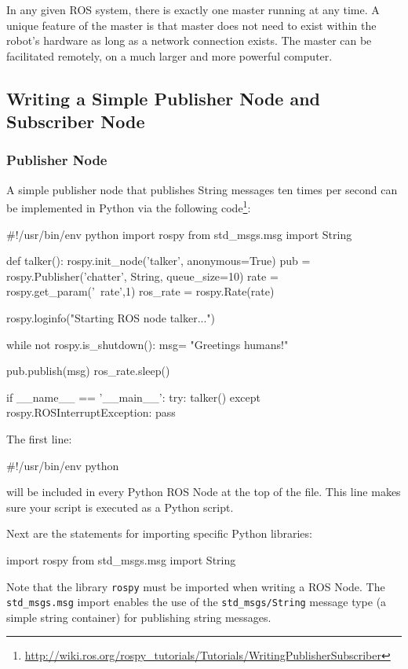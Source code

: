 In any given ROS system, there is exactly one master running at any time. A unique feature of the master is that master does not need to exist within the robot's hardware as long as a network connection exists. The master can be facilitated remotely, on a much larger and more powerful computer.

\subsection{Writing a Simple Publisher Node and Subscriber Node}
\subsubsection{Publisher Node}
A simple publisher node that publishes String messages ten times per second can be implemented in Python via the following code\footnote{\url{http://wiki.ros.org/rospy_tutorials/Tutorials/WritingPublisherSubscriber}}:
\begin{python}
#!/usr/bin/env python
import rospy
from std_msgs.msg import String

def talker():
    rospy.init_node('talker', anonymous=True)
    pub = rospy.Publisher('chatter', String, queue_size=10)
    rate = rospy.get_param('~rate',1)
    ros_rate = rospy.Rate(rate)
    
    rospy.loginfo("Starting ROS node talker...")
    
    while not rospy.is_shutdown():
        msg= "Greetings humans!"
        
        pub.publish(msg)
        ros_rate.sleep()

if __name__ == '__main__':
    try:
        talker()
    except rospy.ROSInterruptException:
        pass

\end{python}
\vspace{\baselineskip}
\noindent
The first line:
\begin{pythonnoborder}
#!/usr/bin/env python
\end{pythonnoborder}
will be included in every Python ROS Node at the top of the file. This line makes sure your script is executed as a Python script. 

\vspace{\baselineskip}
\noindent
Next are the statements for importing specific Python libraries:
\begin{pythonnoborder}
import rospy
from std_msgs.msg import String
\end{pythonnoborder}
Note that the library \texttt{rospy} must be imported when writing a ROS Node. The \texttt{std\_msgs.msg} import enables the use of the \texttt{std\_msgs/String} message type (a simple string container) for publishing string messages.

